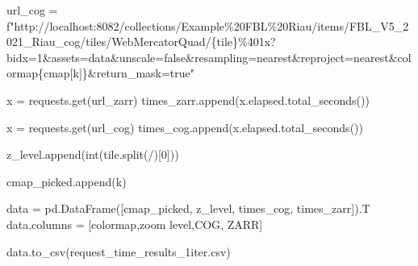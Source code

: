 \documentclass[
  oneside,
  open=any]{scrbook}
\newenvironment{Shaded}{\begin{snugshade}}{\end{snugshade}}
\newcommand{\BuiltInTok}[1]{\textcolor[rgb]{0.00,0.23,0.31}{#1}}
\newcommand{\DecValTok}[1]{\textcolor[rgb]{0.68,0.00,0.00}{#1}}
\newcommand{\NormalTok}[1]{\textcolor[rgb]{0.00,0.23,0.31}{#1}}
\newcommand{\OperatorTok}[1]{\textcolor[rgb]{0.37,0.37,0.37}{#1}}
\newcommand{\SpecialCharTok}[1]{\textcolor[rgb]{0.37,0.37,0.37}{#1}}
\newcommand{\SpecialStringTok}[1]{\textcolor[rgb]{0.13,0.47,0.30}{#1}}
\newcommand{\StringTok}[1]{\textcolor[rgb]{0.13,0.47,0.30}{#1}}
\begin{document}
\begin{Shaded}
\begin{Highlighting}[]
\NormalTok{        url\_cog }\OperatorTok{=} \SpecialStringTok{f"http://localhost:8082/collections/Example\%20FBL\%20Riau/items/FBL\_V5\_2021\_Riau\_cog/tiles/WebMercatorQuad/}\SpecialCharTok{\{}\NormalTok{tile}\SpecialCharTok{\}}\SpecialStringTok{\%401x?bidx=1\&assets=data\&unscale=false\&resampling=nearest\&reproject=nearest\&colormap}\SpecialCharTok{\{}\NormalTok{cmap[k]}\SpecialCharTok{\}}\SpecialStringTok{\&return\_mask=true"}

\NormalTok{        x }\OperatorTok{=}\NormalTok{ requests.get(url\_zarr)}
\NormalTok{        times\_zarr.append(x.elapsed.total\_seconds())}

\NormalTok{        x }\OperatorTok{=}\NormalTok{ requests.get(url\_cog)}
\NormalTok{        times\_cog.append(x.elapsed.total\_seconds())}

\NormalTok{        z\_level.append(}\BuiltInTok{int}\NormalTok{(tile.split(}\StringTok{\textquotesingle{}/\textquotesingle{}}\NormalTok{)[}\DecValTok{0}\NormalTok{]))}

\NormalTok{        cmap\_picked.append(k)}

\NormalTok{data }\OperatorTok{=}\NormalTok{ pd.DataFrame([cmap\_picked, z\_level, times\_cog, times\_zarr]).T}
\NormalTok{data.columns }\OperatorTok{=}\NormalTok{ [}\StringTok{\textquotesingle{}colormap\textquotesingle{}}\NormalTok{,}\StringTok{\textquotesingle{}zoom level\textquotesingle{}}\NormalTok{,}\StringTok{\textquotesingle{}COG\textquotesingle{}}\NormalTok{, }\StringTok{\textquotesingle{}ZARR\textquotesingle{}}\NormalTok{]}

\NormalTok{data.to\_csv(}\StringTok{\textquotesingle{}request\_time\_results\_1iter.csv\textquotesingle{}}\NormalTok{)}
\end{Highlighting}
\end{Shaded}



\backmatter
\end{document}
